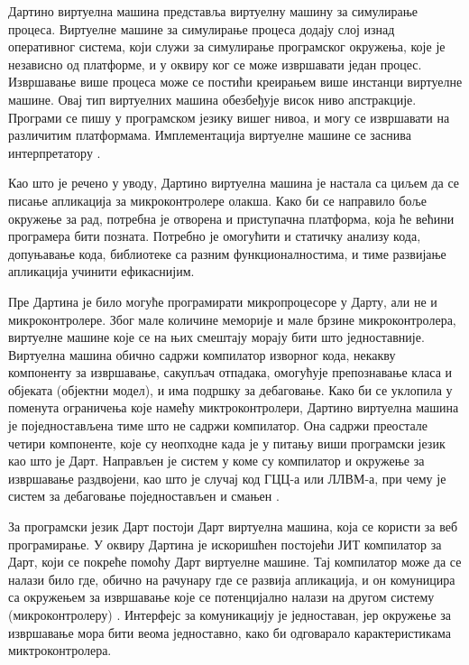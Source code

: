 \documentclass[12pt,oneside]{memoir}
\begin{document}
Дартино виртуелна машина представља виртуелну машину за симулирање процеса. Виртуелне машине за симулирање процеса додају слој изнад оперативног система, који служи за симулирање програмског окружења, које је независно од платформе, и у оквиру ког се може извршавати један процес. Извршавање више процеса може се постићи креирањем више инстанци виртуелне машине. Овај тип виртуелних машина обезбеђује висок ниво апстракције. Програми се пишу у програмском језику вишег нивоа, и могу се извршавати на различитим платформама. Имплементација виртуелне машине се заснива интерпретатору \cite{virtuelna_masina}.

Као што је речено у уводу, Дартино виртуелна машина је настала са циљем да се писање апликација за микроконтролере олакша. Како би се направило боље окружење за рад, потребна је отворена и приступачна платформа, која ће већини програмера бити позната. Потребно је омогућити и статичку анализу кода, допуњавање кода, библиотеке са разним функционалностима, и тиме развијање апликација учинити ефикаснијим.

Пре Дартина је било могуће програмирати микропроцесоре у Дарту, али не и микроконтролере. Због мале количине меморије и мале брзине микроконтролера, виртуелне машине које се на њих смештају морају бити што једноставније. Виртуелна машина обично садржи компилатор изворног кода, некакву компоненту за извршавање, сакупљач отпадака, омогућује препознавање класа и објеката (објектни модел), и има подршку за дебаговање. Како би се уклопила у поменута ограничења које намећу миктроконтролери, Дартино виртуелна машина је поједностављена тиме што не садржи компилатор. Она садржи преостале четири компоненте, које су неопходне када је у питању виши програмски језик као што је Дарт. Направљен је систем у коме су компилатор и окружење за извршавање раздвојени, као што је случај код ГЦЦ-а или ЛЛВМ-а, при чему је систем за дебаговање поједностављен и смањен \cite{Dartino}.

За програмски језик Дарт постоји Дарт виртуелна машина, која се користи за веб програмирање. У оквиру Дартина је искоришћен постојећи ЈИТ компилатор за Дарт, који се покреће помоћу Дарт виртуелне машине. Тај компилатор може да се налази било где, обично на рачунару где се развија апликација, и он комуницира са окружењем за извршавање које се потенцијално налази на другом систему (микроконтролеру) \cite{Dartino}. Интерфејс за комуникацију је једноставан, јер окружење за извршавање мора бити веома једноставно, како би одговарало карактеристикама миктроконтролера.
\end{document}
